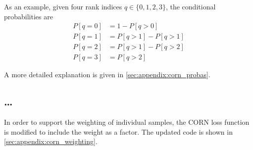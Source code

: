 As an example, given four rank indices $q \in \{0, 1, 2, 3\}$,
the conditional probabilities are
\begin{align*}
  P[q=0] &= 1 - P[q>0] \\
  P[q=1] &= P[q>1] - P[q>1] \\
  P[q=2] &= P[q>1] - P[q>2] \\
  P[q=3] &= P[q>2]
\end{align*}

A more detailed explanation is given in \autoref{sec:appendix:corn_probas}.


\subsection{…}
In order to support the weighting of individual samples,
the CORN loss function is modified
to include the weight as a factor.
The updated code is shown in \autoref{sec:appendix:corn_weighting}.
